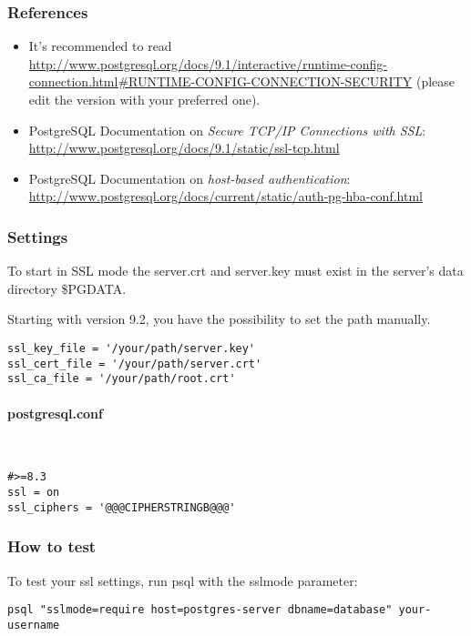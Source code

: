\subsubsection{References}
\begin{itemize}
  \item It's recommended to read {\small \url{http://www.postgresql.org/docs/9.1/interactive/runtime-config-connection.html\#RUNTIME-CONFIG-CONNECTION-SECURITY}} (please edit the version with your preferred one).
  \item PostgreSQL Documentation on \emph{Secure TCP/IP Connections with SSL}: \url{http://www.postgresql.org/docs/9.1/static/ssl-tcp.html}
  \item PostgreSQL Documentation on \emph{host-based authentication}: \url{http://www.postgresql.org/docs/current/static/auth-pg-hba-conf.html}
\end{itemize}


\subsubsection{Settings}
To start in SSL mode the server.crt and server.key must exist in the server's data directory \$PGDATA.

Starting with version 9.2, you have the possibility to set the path manually.

\begin{lstlisting}
ssl_key_file = '/your/path/server.key'
ssl_cert_file = '/your/path/server.crt'
ssl_ca_file = '/your/path/root.crt'
\end{lstlisting}


\paragraph*{postgresql.conf}\mbox{}\\
\begin{lstlisting}
#>=8.3
ssl = on 
ssl_ciphers = '@@@CIPHERSTRINGB@@@'
\end{lstlisting}


\subsubsection{How to test}
To test your ssl settings, run psql with the sslmode parameter:
\begin{lstlisting}
psql "sslmode=require host=postgres-server dbname=database" your-username
\end{lstlisting}

